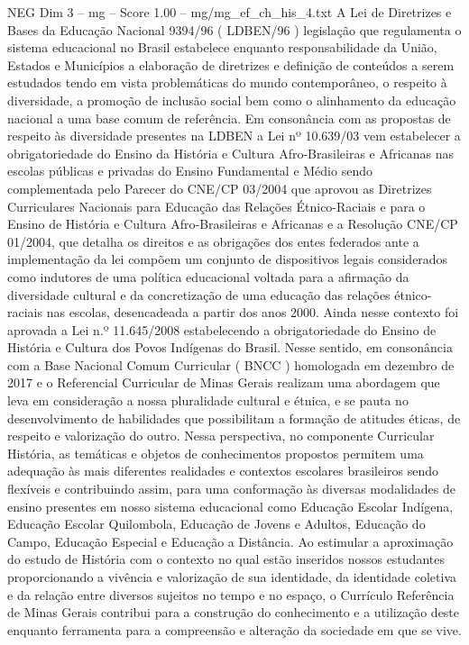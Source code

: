 \begin{textsample}{NEG Dim 3 – mg – Score 1.00 – mg/mg\_ef\_ch\_his\_4.txt}
A Lei de Diretrizes e Bases da Educação Nacional 9394/96 ( LDBEN/96 ) legislação que regulamenta o sistema educacional no Brasil estabelece enquanto responsabilidade da União, Estados e Municípios a elaboração de diretrizes e definição de conteúdos a serem estudados tendo em vista problemáticas do mundo contemporâneo, o respeito à diversidade, a promoção de inclusão social bem como o alinhamento da educação nacional a uma base comum de referência.
Em consonância com as propostas de respeito às diversidade presentes na LDBEN a Lei nº 10.639/03 vem estabelecer a obrigatoriedade do Ensino da História e Cultura Afro-Brasileiras e Africanas nas escolas públicas e privadas do Ensino Fundamental e Médio sendo complementada pelo Parecer do CNE/CP 03/2004 que aprovou as Diretrizes Curriculares Nacionais para Educação das Relações Étnico-Raciais e para o Ensino de História e Cultura Afro-Brasileiras e Africanas e a Resolução CNE/CP 01/2004, que detalha os direitos e as obrigações dos entes federados ante a implementação da lei compõem um conjunto de dispositivos legais considerados como indutores de uma política educacional voltada para a afirmação da diversidade cultural e da concretização de uma educação das relações étnico-raciais nas escolas, desencadeada a partir dos anos 2000.
Ainda nesse contexto foi aprovada a Lei n.º 11.645/2008 estabelecendo a obrigatoriedade do Ensino de História e Cultura dos Povos Indígenas do Brasil.
Nesse sentido, em consonância com a Base Nacional Comum Curricular ( BNCC ) homologada em dezembro de 2017 e o Referencial Curricular de Minas Gerais realizam uma abordagem que leva em consideração a nossa pluralidade cultural e étnica, e se pauta no desenvolvimento de habilidades que possibilitam a formação de atitudes éticas, de respeito e valorização do outro.
Nessa perspectiva, no componente Curricular História, as temáticas e objetos de conhecimentos propostos permitem uma adequação às mais diferentes realidades e contextos escolares brasileiros sendo flexíveis e contribuindo assim, para uma conformação às diversas modalidades de ensino presentes em nosso sistema educacional como Educação Escolar Indígena, Educação Escolar Quilombola, Educação de Jovens e Adultos, Educação do Campo, Educação Especial e Educação a Distância.
Ao estimular a aproximação do estudo de História com o contexto no qual estão inseridos nossos estudantes proporcionando a vivência e valorização de sua identidade, da identidade coletiva e da relação entre diversos sujeitos no tempo e no espaço, o Currículo Referência de Minas Gerais contribui para a construção do conhecimento e a utilização deste enquanto ferramenta para a compreensão e alteração da sociedade em que se vive.

\end{textsample}
